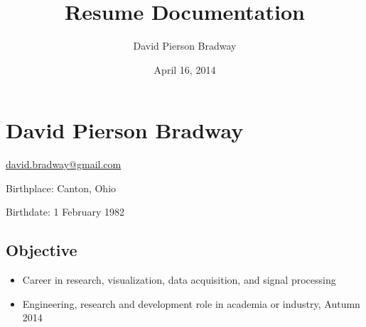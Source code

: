 \documentclass[letterpaper,10pt,english]{sphinxmanual}
\title{Resume Documentation}
\date{April 16, 2014}
\author{David Pierson Bradway}
\begin{document}
\maketitle
\tableofcontents
{}\label{index::doc}



\chapter{David Pierson Bradway}
\label{resume:resume-cv-of-david-pierson-bradway}\label{resume::doc}\label{resume:david-pierson-bradway}
\begin{DUlineblock}{0em}
\item[] \href{mailto:david.bradway@gmail.com}{david.bradway@gmail.com}
\item[] Birthplace: Canton, Ohio
\item[] Birthdate: 1 February 1982
\end{DUlineblock}


\section{Objective}
\label{resume:objective}\begin{itemize}
\item {} 
Career in research, visualization, data acquisition, and signal
processing

\item {} 
Engineering, research and development role in academia or industry,
Autumn 2014

\end{itemize}
\end{document}
